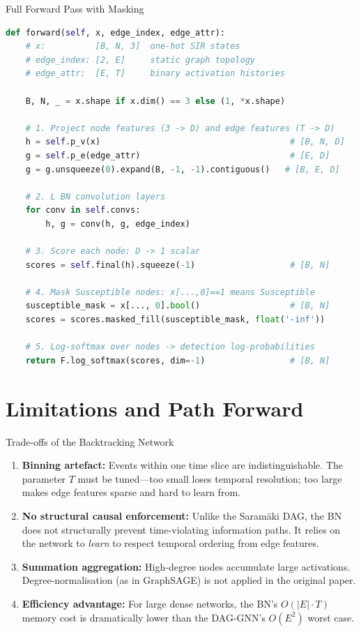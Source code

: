 \begin{codewalk}{Full Forward Pass with Masking}
\begin{lstlisting}[language=Python]
def forward(self, x, edge_index, edge_attr):
    # x:          [B, N, 3]  one-hot SIR states
    # edge_index: [2, E]     static graph topology
    # edge_attr:  [E, T]     binary activation histories

    B, N, _ = x.shape if x.dim() == 3 else (1, *x.shape)

    # 1. Project node features (3 -> D) and edge features (T -> D)
    h = self.p_v(x)                                      # [B, N, D]
    g = self.p_e(edge_attr)                              # [E, D]
    g = g.unsqueeze(0).expand(B, -1, -1).contiguous()   # [B, E, D]

    # 2. L BN convolution layers
    for conv in self.convs:
        h, g = conv(h, g, edge_index)

    # 3. Score each node: D -> 1 scalar
    scores = self.final(h).squeeze(-1)                   # [B, N]

    # 4. Mask Susceptible nodes: x[...,0]==1 means Susceptible
    susceptible_mask = x[..., 0].bool()                  # [B, N]
    scores = scores.masked_fill(susceptible_mask, float('-inf'))

    # 5. Log-softmax over nodes -> detection log-probabilities
    return F.log_softmax(scores, dim=-1)                 # [B, N]
\end{lstlisting}
\end{codewalk}

\section{Limitations and Path Forward}

\begin{conceptbox}{Trade-offs of the Backtracking Network}
\begin{enumerate}[noitemsep]
    \item \textbf{Binning artefact:} Events within one time slice are indistinguishable. The parameter $T$ must be tuned---too small loses temporal resolution; too large makes edge features sparse and hard to learn from.
    \item \textbf{No structural causal enforcement:} Unlike the Saramäki DAG, the BN does not structurally prevent time-violating information paths. It relies on the network to \emph{learn} to respect temporal ordering from edge features.
    \item \textbf{Summation aggregation:} High-degree nodes accumulate large activations. Degree-normalisation (as in GraphSAGE) is not applied in the original paper.
    \item \textbf{Efficiency advantage:} For large dense networks, the BN's $O(|E| \cdot T)$ memory cost is dramatically lower than the DAG-GNN's $O(E^2)$ worst case.
\end{enumerate}
\end{conceptbox}

